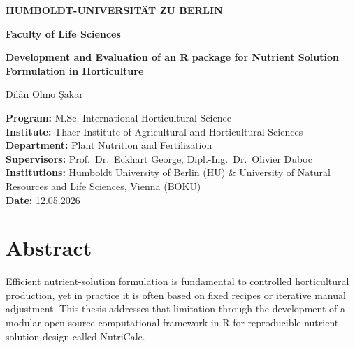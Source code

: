 \documentclass[
  letterpaper,
  DIV=11,
  numbers=noendperiod]{scrreprt}
\author{}
\date{}
\renewcommand*\contentsname{Table of contents}
\newcommand\contentsname{Table of contents}
\begin{document}
\thispagestyle{empty}

\vspace*{3cm}

\begin{center}

{\huge \textbf{HUMBOLDT-UNIVERSITÄT ZU BERLIN}\par}
\vspace{1.5cm}
{\LARGE \textbf{Faculty of Life Sciences}\par}
\vspace{3cm}
{\LARGE \textbf{Development and Evaluation of an R package for Nutrient Solution Formulation in Horticulture}\par}
\vspace{1.5cm}

{\large Dilân Olmo Şakar\par}
\vspace{1.5cm}

\Large
\textbf{Program:} M.Sc. International Horticultural Science\\[0.6em]
\textbf{Institute:} Thaer-Institute of Agricultural and Horticultural Sciences\\[0.6em]
\textbf{Department:} Plant Nutrition and Fertilization\\[0.6em]
\textbf{Supervisors:} Prof.\ Dr.\ Eckhart George, Dipl.-Ing.\ Dr.\ Olivier Duboc\\[0.6em]
\textbf{Institutions:} Humboldt University of Berlin (HU) \& University of Natural Resources and Life Sciences, Vienna (BOKU)\\[0.6em]
\textbf{Date:} 12.05.2026
\end{center}

\clearpage

\renewcommand*\contentsname{Table of contents}
{
\hypersetup{linkcolor=black}
\setcounter{tocdepth}{3}
\tableofcontents
}

\clearpage
{}
\setcounter{page}{1}

\chapter*{Abstract}\label{abstract}

Efficient nutrient-solution formulation is fundamental to controlled
horticultural production, yet in practice it is often based on fixed
recipes or iterative manual adjustment. This thesis addresses that
limitation through the development of a modular open-source
computational framework in R for reproducible nutrient-solution design
called NutriCalc.
\end{document}
